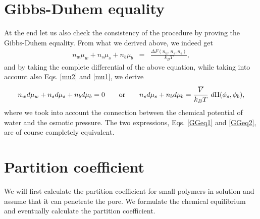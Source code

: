 \documentclass[11pt,a4paper]{article}
\begin{document}
\section{Gibbs-Duhem equality}

At the end let us also check the consistency of the procedure by proving the Gibbs-Duhem equality. From what we derived above, we indeed get
\begin{eqnarray}
n_w\mu_{w} + n_s\mu_{s} + n_b\mu_{b} &=& \frac{\Delta F(n_w, n_s, n_b)}{k_B T},
\label{GGeq1}
\end{eqnarray}
and by taking the complete differential of the above equation, while taking into account also Eqs. \ref{mu2} and \ref{mu1}, we derive
\begin{equation}
n_w d\mu_{w} + n_s d\mu_{s} + n_b d\mu_{b} = 0 \qquad {\rm or} \qquad n_s d\mu_{s} + n_b d\mu_{b} = \frac{\overline V }{k_B T} ~d\Pi(\phi_s, \phi_b),
\label{GGeq2}
\end{equation}
where we took into account the connection between the chemical potential of water and the osmotic pressure. The two expressions, Eqs. \ref{GGeq1} and \ref{GGeq2}, are of course completely equivalent.

\section{Partition coefficient}

We will first calculate the partition coefficient for small polymers in solution and assume that it can penetrate the pore. We formulate the chemical equilibrium and eventually calculate the partition coefficient.
\end{document}
